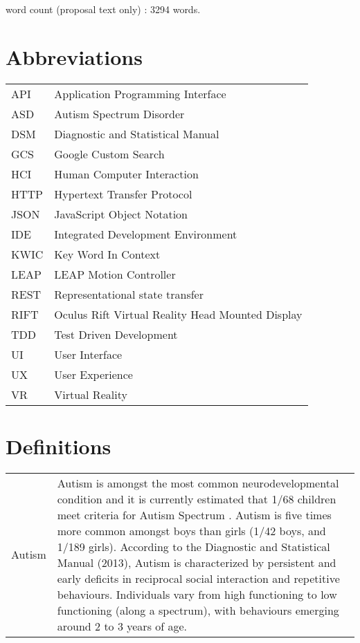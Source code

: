 \documentclass[a4paper, 11pt]{article}
\begin{document}
\begin{center}
word count (proposal text only) : 3294 words.
\end{center}

\clearpage
\tableofcontents
\clearpage

\section*{Abbreviations}
\begin{tabular}{l l }
API & Application Programming Interface\\
ASD & Autism Spectrum Disorder\\
DSM & Diagnostic and Statistical Manual\\
GCS & Google Custom Search\\
HCI & Human Computer Interaction\\
HTTP & Hypertext Transfer Protocol\\
JSON & JavaScript Object Notation\\
IDE & Integrated Development Environment\\
KWIC & Key Word In Context\\
LEAP & LEAP Motion Controller\\
REST & Representational state transfer\\
RIFT & Oculus Rift Virtual Reality Head Mounted Display\\
TDD & Test Driven Development\\
UI & User Interface\\
UX & User Experience\\
VR & Virtual Reality\\
\end{tabular}

\section*{Definitions}

\begin{tabular}{l p{15cm}  }
Autism & Autism is amongst the most common neurodevelopmental condition and it is currently estimated that 1/68 children meet criteria for Autism Spectrum \cite{CDC}. Autism is five times more common amongst boys than girls (1/42 boys, and 1/189 girls). According to the Diagnostic and Statistical Manual (2013), Autism is characterized by persistent and early deficits in reciprocal social interaction and repetitive behaviours. Individuals vary from high functioning to low functioning (along a spectrum), with behaviours emerging around 2 to 3 years of age.
\end{tabular}
\clearpage
\end{document}
